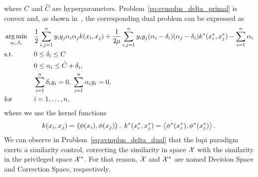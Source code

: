 where $C$ and $\hat{C}$ are hyperparameters.
Problem~\eqref{eq:svmplus_delta_primal} is convex and, as shown in~\cite{VapnikI15a}, the corresponding dual problem can be expressed as
\begin{equation}\label{eq:svmplus_delta_dual}
    \begin{aligned}
        & \argmin_{\alpha_i, \delta_i} 
        & & \frac{1}{2} \sum_{i, j=1}^\nsamples y_i y_j \alpha_i \alpha_j k(x_i, x_j) +\frac{1}{2 \mu} \sum_{i, j=1}^\nsamples y_i y_j (\alpha_i - \delta_i) (\alpha_j - \delta_i) k^*(x^*_i, x^*_j)  - \sum_{i=1}^\nsamples \alpha_i \\
        & \text{s.t.}
        & & 0 \leq \delta_i \leq C  \\
        & & & 0 \leq \alpha_i \leq \hat{C} + \delta_i, \\
        & & & \sum_{i=1}^{\nsamples}{\delta_i y_i} = 0, \; 
        \sum_{i=1}^{\nsamples}{\alpha_i y_i} = 0, \\
        & \text{for } & & i=1, \ldots, \nsamples,
        \end{aligned}
\end{equation}
where we use the kernel functions
$$k(x_i, x_j) = \bm{\left\langle} \phi(x_i), \phi(x_j) \bm{\right\rangle}, \; k^*(x^*_i, x^*_j) = \bm{\left\langle} \phi^*(x^*_i), \phi^*(x^*_j) \bm{\right\rangle}.$$ 
We can observe in Problem~\eqref{eq:svmplus_delta_dual} that the \acrshort{lupi} paradigm exerts a similarity control, correcting the similarity in space $\mathcal{X}$ with the similarity in the privileged space $\mathcal{X}^*$. For that reason, $\mathcal{X}$ and $\mathcal{X}^*$ are named Decision Space and Correction Space, respectively.


